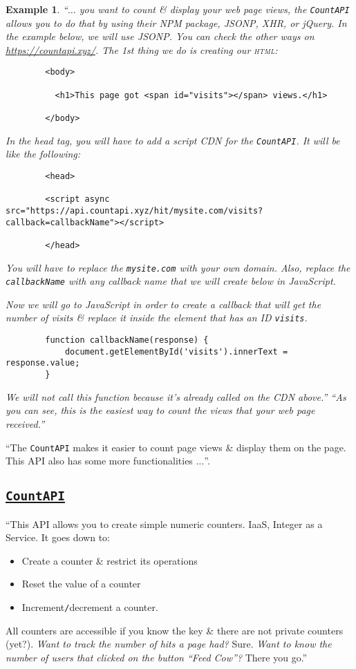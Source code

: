 \documentclass{article}
\numberwithin{equation}{section}
\newtheorem{example}{Example}[section]
\begin{document}
\begin{example}
	``$\ldots$ you want to count \& display your web page views, the \texttt{CountAPI} allows you to do that by using their NPM package, JSONP, XHR, or jQuery. In the example below, we will use JSONP. You can check the other ways on \url{https://countapi.xyz/}. The 1st thing we do is creating our \textsc{html}:	
	\begin{verbatim}
		<body>
		
		  <h1>This page got <span id="visits"></span> views.</h1>
		
		</body>
	\end{verbatim}
	In the head tag, you will have to add a script CDN for the \texttt{CountAPI}. It will be like the following:	
	\begin{verbatim}
		<head>
		
		<script async src="https://api.countapi.xyz/hit/mysite.com/visits?  callback=callbackName"></script>
		
		</head>
	\end{verbatim}
	You will have to replace the \verb|mysite.com| with your own domain. Also, replace the \verb|callbackName| with any callback name that we will create below in JavaScript.
	
	Now we will go to JavaScript in order to create a callback that will get the number of visits \& replace it inside the element that has an ID \verb|visits|.	
	\begin{verbatim}
		function callbackName(response) {
		    document.getElementById('visits').innerText = response.value;
		}
	\end{verbatim}
	We will not call this function because it's already called on the CDN above.'' ``As you can see, this is the easiest way to count the views that your web page received.''
\end{example}
``The \texttt{CountAPI} makes it easier to count page views \& display them on the page. This API also has some more functionalities $\ldots$''.

\subsection{\href{https://countapi.xyz/}{\texttt{CountAPI}}}
``This API allows you to create simple numeric counters. IaaS, Integer as a Service. It goes down to:
\begin{itemize}
	\item Create a counter \& restrict its operations
	\item Reset the value of a counter
	\item Increment\texttt{/}decrement a counter.
\end{itemize}
All counters are accessible if you know the key \& there are not private counters (yet?). \textit{Want to track the number of hits a page had?} Sure. \textit{Want to know the number of users that clicked on the button ``Feed Cow''?} There you go.''
\end{document}
